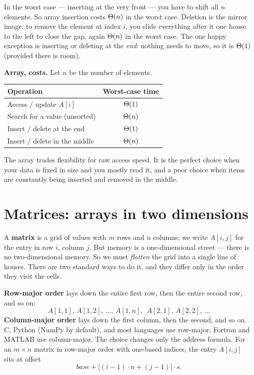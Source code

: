 In the worst case --- inserting at the very front --- you have to shift all $n$ elements. So array insertion costs $\Theta(n)$ in the worst case. Deletion is the mirror image: to remove the element at index $i$, you slide everything after it one house to the left to close the gap, again $\Theta(n)$ in the worst case. The one happy exception is inserting or deleting at the \emph{end}: nothing needs to move, so it is $\Theta(1)$ (provided there is room).

\begin{complexitybox}
\textbf{Array, costs.} Let $n$ be the number of elements.
\begin{center}
\begin{tabular}{lc}
\toprule
Operation & Worst-case time \\
\midrule
Access / update $A[i]$ & $\Theta(1)$ \\
Search for a value (unsorted) & $\Theta(n)$ \\
Insert / delete at the end & $\Theta(1)$ \\
Insert / delete in the middle & $\Theta(n)$ \\
\bottomrule
\end{tabular}
\end{center}
The array trades flexibility for raw access speed. It is the perfect choice when your data is fixed in size and you mostly read it, and a poor choice when items are constantly being inserted and removed in the middle.
\end{complexitybox}

\section{Matrices: arrays in two dimensions}
\label{ch10:matrix}

A \textbf{matrix} is a grid of values with $m$ rows and $n$ columns; we write $A[i,j]$ for the entry in row $i$, column $j$. But memory is a one-dimensional street --- there is no two-dimensional memory. So we must \emph{flatten} the grid into a single line of houses. There are two standard ways to do it, and they differ only in the order they visit the cells.

\textbf{Row-major order} lays down the entire first row, then the entire second row, and so on:
\[
  A[1,1],\, A[1,2],\, \dots,\, A[1,n],\ \ A[2,1],\, A[2,2],\, \dots
\]
\textbf{Column-major order} lays down the first column, then the second, and so on. C, Python (NumPy by default), and most languages use row-major; Fortran and MATLAB use column-major. The choice changes only the address formula. For an $m\times n$ matrix in row-major order with one-based indices, the entry $A[i,j]$ sits at offset
\[
  base + \big[(i-1)\cdot n + (j-1)\big]\cdot s.
\]

